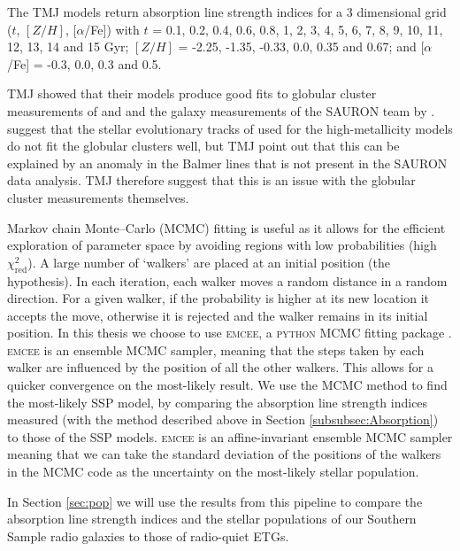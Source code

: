 			The TMJ models return absorption line strength indices for a 3 dimensional grid ($t$, $[Z/H]$, [$\alpha$/Fe]) with $t$ = 0.1, 0.2, 0.4, 0.6, 0.8, 1, 2, 3, 4, 5, 6, 7, 8, 9, 10, 11, 12, 13, 14 and 15 Gyr; $[Z/H]$ = -2.25, -1.35, -0.33, 0.0, 0.35 and 0.67; and [$\alpha$/Fe] = -0.3, 0.0, 0.3 and 0.5.

			TMJ showed that their models produce  good fits to globular cluster measurements of \citet{Puzia2002} and \citet{Schiavon2005} and the galaxy measurements of the SAURON team by \citet{Kuntschner2010}. \citet{Conroy2010} suggest that the stellar evolutionary tracks of \citet{Girardi2000} used for the high-metallicity models do not fit the globular clusters well, but TMJ point out that this can be explained by an anomaly in the Balmer lines that is not present in the SAURON data analysis. TMJ therefore suggest that this is an issue with the globular cluster measurements themselves. 


			Markov chain Monte--Carlo (MCMC) fitting is useful as it allows for the efficient exploration of parameter space by avoiding regions with low probabilities (high $\chi^2_\text{red}$). A large number of `walkers' are placed at an initial position (the hypothesis). In each iteration, each walker moves a random distance in a random direction. For a given walker, if the probability is higher at its new location it accepts the move, otherwise it is rejected and the walker remains in its initial position. In this thesis we choose to use \textsc{emcee}, a \textsc{python} MCMC fitting  package \citep{Foreman-Mackey2013}. \textsc{emcee} is an ensemble MCMC sampler, meaning that the steps taken by each walker are influenced by the position of all the other walkers. This allows for a quicker convergence on the most-likely result. We use the MCMC method to find the most-likely SSP model, by comparing the absorption line strength indices measured (with the method described above in Section \ref{subsubsec:Absorption}) to those of the SSP models. \textsc{emcee} is an affine-invariant ensemble MCMC sampler meaning that we can take the standard deviation of the positions of the walkers in the MCMC code as the uncertainty on the most-likely stellar population.

			In Section \ref{sec:pop} we will use the results from this pipeline to compare the absorption line strength indices and the stellar populations of our Southern Sample radio galaxies to those of radio-quiet ETGs.
